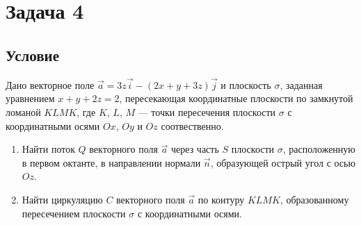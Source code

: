 \documentclass[12pt]{article}
\begin{document}
	\section*{Задача 4}	
	\subsection*{Условие}
	
	Дано векторное поле $\vec{a} =3z\vec{i} - (2x+y+3z)\vec{j}$ и плоскость $\sigma$, заданная уравнением $x + y + 2z = 2$, пересекающая координатные плоскости по замкнутой ломаной $KLMK$, где $K$, $L$, $M$ --- точки пересечения	плоскости $\sigma$ с координатными осями $ Ox $, $ Oy $ и $ Oz $ соотвественно.
	\begin{enumerate}
		\item Найти поток $Q$ векторного поля $\vec{a}$ через часть $S$ плоскости $ \sigma $, расположенную в первом октанте, в направлении нормали $ \vec{n} $, образующей острый угол с осью $ Oz $.
		\item Найти циркуляцию $C$ векторного поля $\vec{a}$ по контуру $ KLMK $, образованному пересечением плоскости $\sigma$ с координатными осями.
	\end{enumerate}
\end{document}
